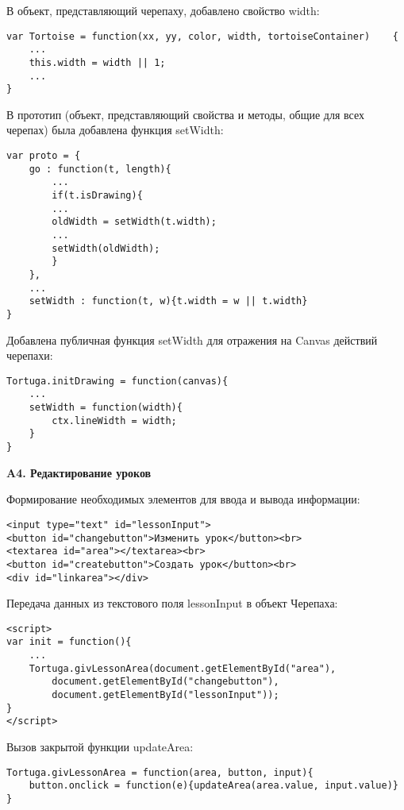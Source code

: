 В объект, представляющий черепаху, добавлено свойство width:
\begin{verbatim}
var Tortoise = function(xx, yy, color, width, tortoiseContainer)	{		
    ...
    this.width = width || 1;
    ...
}
\end{verbatim}
В прототип (объект, представляющий свойства и методы, общие для всех черепах) была добавлена функция setWidth:

\begin{verbatim}
var proto = {
    go : function(t, length){
        ...
        if(t.isDrawing){
        ...
        oldWidth = setWidth(t.width);
        ...
        setWidth(oldWidth);
        }
    },
    ...
    setWidth : function(t, w){t.width = w || t.width}
}
\end{verbatim}

Добавлена публичная функция setWidth для отражения на Canvas действий черепахи:
\begin{verbatim}
Tortuga.initDrawing = function(canvas){
    ...
    setWidth = function(width){
        ctx.lineWidth = width;
    }
} 
\end{verbatim}

\vspace{16mm}
\textbf{\Large A4. Редактирование уроков}
\vspace{6mm}

Формирование необходимых элементов для ввода и вывода информации:
\begin{verbatim}
<input type="text" id="lessonInput">
<button id="changebutton">Изменить урок</button><br>
<textarea id="area"></textarea><br>
<button id="createbutton">Создать урок</button><br>
<div id="linkarea"></div>
\end{verbatim}

Передача данных из  текстового поля lessonInput в объект Черепаха:
\begin{verbatim}
<script>
var init = function(){
    ...
    Tortuga.givLessonArea(document.getElementById("area"),
        document.getElementById("changebutton"),
        document.getElementById("lessonInput"));
}
</script>
\end{verbatim}

Вызов закрытой функции updateArea:
\begin{verbatim}
Tortuga.givLessonArea = function(area, button, input){
    button.onclick = function(e){updateArea(area.value, input.value)}
}
\end{verbatim}

